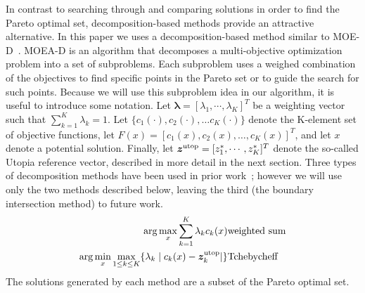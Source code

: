 \documentclass{article}
\begin{document}
In contrast to searching through and comparing solutions in order to find the Pareto optimal set, decomposition-based methods provide an attractive alternative.  
In this paper we uses a decomposition-based method similar to MOE-D~\cite{4358754}.  
MOEA-D is an algorithm that decomposes a multi-objective optimization problem into a set of subproblems.  
Each subproblem uses a weighed combination of the objectives to find specific points in the Pareto set or to guide the search for such points.  
Because we  will use this subproblem idea in our algorithm, it is useful to introduce some notation.
Let $ \bm{\lambda} = [ \lambda_{1} , \cdots , \lambda_{K}  ]^{T} $ be a weighting vector such that $ \sum_{k=1}^{K} \lambda_{k} = 1 $.  
Let $\{c_{1}(\cdot), c_{2}(\cdot), \ldots c_{K}(\cdot)\}$ denote the K-element set of objective functions, let $F(x) = [c_{1}(x), c_{2}(x), \ldots, c_{K}(x)]^T$, and let $x$ denote a potential solution.  Finally, let $ \bm{z}^{\rm utop} = [z^{*}_{1}, \cdots , z^{*}_{K}]^{T} $ denote the so-called Utopia reference vector, described in more detail in the next section. 
Three types of decomposition methods have been used in prior work~\cite{4358754}; however we will use only the two methods described below, leaving the third (the boundary intersection method) to future work.
\begin{eqnarray}
 \arg\max_x \sum_{k=1}^{K} \lambda_{k} c_{k} (x) & {\rm weighted \ sum} \label{eq:weighted}\\
 \arg\min_x\max_{1 \leq k \leq K}  \{ \lambda_{k} \mid c_{k}(x) - \bm{z}^{\rm utop}_{k}  | \} & {\rm Tchebycheff} \label{eq:Tchebycheff}%
\end{eqnarray}
The solutions generated by each method are a subset of the Pareto optimal set.
\end{document}
